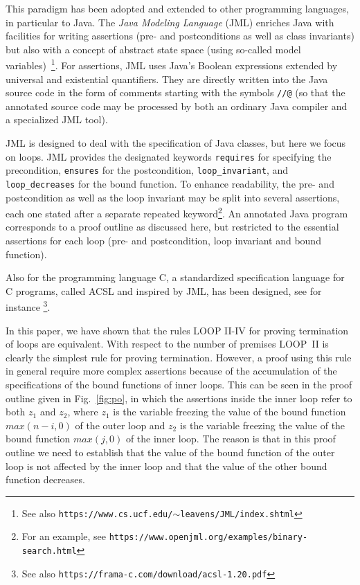 \documentclass[manuscript, screen, review]{acmart}
\begin{document}
This paradigm has been adopted and extended to other programming
languages, in particular to Java.
The \emph{Java Modeling Language} (JML) enriches Java with facilities for 
writing assertions (pre- and postconditions as well as 
class invariants) but also with a concept of abstract state space 
(using so-called model variables)~\cite{JML05}\footnote{See also
  \texttt{https://www.cs.ucf.edu/$\sim$leavens/JML/index.shtml}}.
For assertions, JML uses Java’s Boolean expressions extended by
universal and existential quantifiers. 
They are directly written into the Java source code in the form of comments 
starting with the symbols \texttt{//@}
(so that the annotated source code may be processed by both an ordinary Java compiler 
and a specialized JML tool). 

JML is designed to deal with the specification of Java classes,
but here we focus on loops.
JML provides the designated keywords 
\texttt{requires} for specifying the precondition,
\texttt{ensures} for the postcondition,
\texttt{loop\_invariant}, and 
\texttt{loop\_decreases} for the bound function.
To enhance readability, the pre- and postcondition as well as the loop invariant may be split into several
assertions, each one stated after a separate repeated keyword\footnote{For an example, see 
       \texttt{https://www.openjml.org/examples/binary-search.html}}.
An annotated Java program corresponds to a proof outline as discussed here,
but restricted to the essential assertions for each loop (pre- and postcondition,
loop invariant and bound function).

Also for the programming language C, a standardized specification language for C programs, 
called ACSL and inspired by JML, has been designed, see for instance
\cite{BBBCKKMPPS21}\footnote{See also
       \texttt{https://frama-c.com/download/acsl-1.20.pdf}}.


\medskip

In this paper, we have shown that  the rules LOOP II-IV 
for proving termination of loops are equivalent.
With respect to the number of premises LOOP~II is clearly
the simplest rule for proving termination.
However,  a proof using this rule in general require more
complex assertions because of the accumulation of the
specifications of the bound functions of  inner loops.
This can be seen in the proof outline given in Fig.~\ref{fig:po}, 
in which the assertions inside the inner loop refer to both $z_1$ and $z_2$,
where $z_1$ is the variable freezing the value of the bound function $max(n-i,0)$ of the outer loop
and $z_2$ is the variable freezing the value of the bound function $max(j,0)$ of the inner loop.
The reason is that in this proof outline we need to establish 
that the value of the bound function of the outer loop is not affected 
by the inner loop and that the value of the other bound function decreases.
\end{document}
